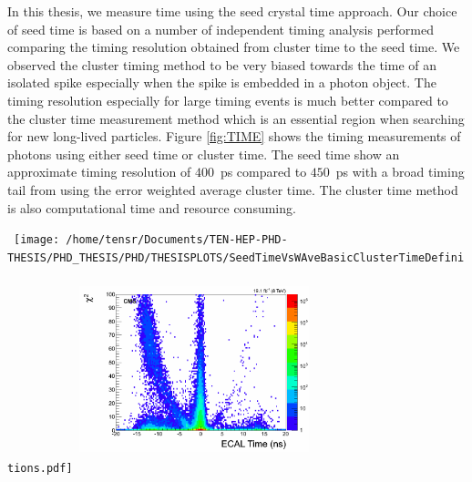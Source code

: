 In this thesis, we measure time using the seed crystal time approach. Our choice of seed time is based on a number of independent timing analysis performed comparing the timing resolution obtained from cluster time to the seed time. We observed the cluster timing method to be very biased towards the time of an isolated spike especially when the spike is embedded in a photon object. The timing resolution especially for large timing events is much better compared to the cluster time measurement method which is an essential region when searching for new long-lived particles.
Figure \ref{fig:TIME} shows the timing measurements of photons using either seed time or cluster time. The seed time show an approximate timing resolution of $400$~ps compared to $450$~ps with a broad timing tail from using the error weighted average cluster time. The cluster time method is also computational time and resource consuming.

\begin{center}
\centering
\mbox{
\texttt{[image: /home/tensr/Documents/TEN-HEP-PHD-THESIS/PHD\_THESIS/PHD/THESISPLOTS/SeedTimeVsWAveBasicClusterTimeDefinitions.pdf]}
\includegraphics[height=6cm, width=0.5\textwidth]{THESISPLOTS/seedTime_Chi2.png}
}
\label{fig:TIME}
\end{center}

